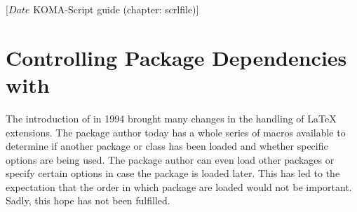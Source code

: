 %
%
%
%
%
%
%
%
% 
%
%
%
%

                 [$Date$
                  KOMA-Script guide (chapter: scrlfile)]


\chapter{Controlling Package Dependencies with }
\BeginIndexGroup
{}

The introduction of \LaTeXe{} in 1994 brought many changes in the handling of
\LaTeX{} extensions. The package author today has a whole series of macros
available to determine if another package or class has been loaded and whether
specific options are being used. The package author can even load other
packages or specify certain options in case the package is loaded later. This
has led to the expectation that the order in which package are loaded would
not be important. Sadly, this hope has not been fulfilled.

